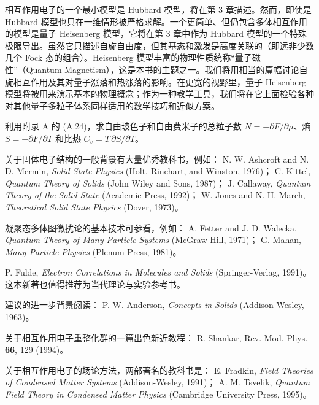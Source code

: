 相互作用电子的一个最小模型是 Hubbard 模型，将在第 3 章描述。然而，即使是 Hubbard 模型也只在一维情形被严格求解。一个更简单、但仍包含多体相互作用的模型是量子 Heisenberg 模型，它将在第 3 章中作为 Hubbard 模型的一个特殊极限导出。虽然它只描述自旋自由度，但其基态和激发是高度关联的（即远非少数几个 Fock 态的组合）。Heisenberg 模型丰富的物理性质统称“量子磁性”（Quantum Magnetism），这是本书的主题之一。我们将用相当的篇幅讨论自旋相互作用及其对量子涨落和热涨落的影响。在更宽的视野里，量子 Heisenberg 模型将被用来演示基本的物理概念；作为一种教学工具，我们将在它上面检验各种对其他量子多粒子体系同样适用的数学技巧和近似方案。

\begin{exercises}

\item 利用附录 A 的 (A.24)，求自由玻色子和自由费米子的总粒子数 $N = -\partial F/\partial \mu$、熵 $S = -\partial F/\partial T$ 和比热 $C_{v} = T \,\partial S/\partial T$。

\end{exercises}

\begin{chapbib}
\item 关于固体电子结构的一般背景有大量优秀教科书，例如：
  N. W. Ashcroft and N. D. Mermin, \textit{Solid State Physics} (Holt, Rinehart, and Winston, 1976)；
  C. Kittel, \textit{Quantum Theory of Solids} (John Wiley and Sons, 1987)；
  J. Callaway, \textit{Quantum Theory of the Solid State} (Academic Press, 1992)；
  W. Jones and N. H. March, \textit{Theoretical Solid State Physics} (Dover, 1973)。
\item 凝聚态多体图微扰论的基本技术可参看，例如：
  A. Fetter and J. D. Walecka, \textit{Quantum Theory of Many Particle Systems} (McGraw-Hill, 1971)；
  G. Mahan, \textit{Many Particle Physics} (Plenum Press, 1981)。
\item P. Fulde, \textit{Electron Correlations in Molecules and Solids} (Springer-Verlag, 1991)。
  这本新著也值得推荐为当代理论与实验参考书。
\item 建议的进一步背景阅读：
  P. W. Anderson, \textit{Concepts in Solids} (Addison-Wesley, 1963)。
\item 关于相互作用电子重整化群的一篇出色新近教程：
  R. Shankar, Rev. Mod. Phys. \textbf{66}, 129 (1994)。
\item 关于相互作用电子的场论方法，两部著名的教科书是：
  E. Fradkin, \textit{Field Theories of Condensed Matter Systems} (Addison-Wesley, 1991)；
  A. M. Tsvelik, \textit{Quantum Field Theory in Condensed Matter Physics} (Cambridge University Press, 1995)。
\end{chapbib}
